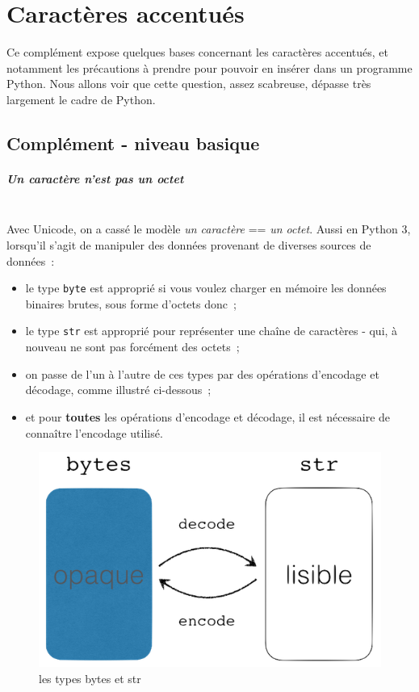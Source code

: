     \hypertarget{caractuxe8res-accentuuxe9s}{%
\section{Caractères accentués}\label{caractuxe8res-accentuuxe9s}}

    Ce complément expose quelques bases concernant les caractères accentués,
et notamment les précautions à prendre pour pouvoir en insérer dans un
programme Python. Nous allons voir que cette question, assez scabreuse,
dépasse très largement le cadre de Python.

    \hypertarget{compluxe9ment---niveau-basique}{%
\subsection{Complément - niveau
basique}\label{compluxe9ment---niveau-basique}}

    \hypertarget{un-caractuxe8re-nest-pas-un-octet}{%
\subparagraph{Un caractère n'est pas un
octet\\\\}\label{un-caractuxe8re-nest-pas-un-octet}}

    Avec Unicode, on a cassé le modèle \emph{un caractère} == \emph{un
octet}. Aussi en Python 3, lorsqu'il s'agit de manipuler des données
provenant de diverses sources de données~:

\begin{itemize}
	\item
	le type \texttt{byte} est
	approprié si vous voulez charger en mémoire les données binaires brutes,
	sous forme d'octets donc~;
	\item
	le type \texttt{str} est approprié pour
	représenter une chaîne de caractères - qui, à nouveau ne sont pas
	forcément des octets~;
	\item
	on passe de l'un à l'autre de ces types par des
	opérations d'encodage et décodage, comme illustré ci-dessous~;
	\item
	et pour
	\textbf{toutes} les opérations d'encodage et décodage, il est nécessaire
	de connaître l'encodage utilisé.
\end{itemize}

\begin{figure}[h!]
	\centering
	\includegraphics{medias/str-bytes.png}
	\caption{les types bytes et str}
\end{figure}

